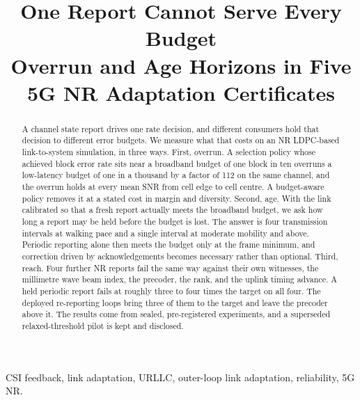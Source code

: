\documentclass[conference]{IEEEtran}
\begin{document}
\title{One Report Cannot Serve Every Budget\\
Overrun and Age Horizons in Five 5G NR Adaptation Certificates}

\author{
}

\maketitle
\thispagestyle{empty}
\pagestyle{empty}         %

\begin{abstract}
A channel state report drives one rate decision, and different consumers hold
that decision to different error budgets. We measure what that costs on an NR
LDPC-based link-to-system simulation, in three ways. First, overrun. A selection
policy whose achieved block error rate sits near a broadband budget of one block
in ten overruns a low-latency budget of one in a thousand by a factor of 112 on
the same channel, and the overrun holds at every mean SNR from cell edge to cell
centre. A budget-aware policy removes it at a stated cost in margin and
diversity. Second, age. With the link calibrated so that a fresh report actually
meets the broadband budget, we ask how long a report may be held before the
budget is lost. The answer is four transmission intervals at walking pace and a
single interval at moderate mobility and above. Periodic reporting alone then
meets the budget only at the frame minimum, and correction driven by
acknowledgements becomes necessary rather than optional. Third, reach. Four
further NR reports fail the same way against their own witnesses, the millimetre
wave beam index, the precoder, the rank, and the uplink timing advance. A held
periodic report fails at roughly three to four times the target on all four. The
deployed re-reporting loops bring three of them to the target and leave the
precoder above it. The results come from sealed, pre-registered experiments,
and a superseded relaxed-threshold pilot is kept and disclosed.
\end{abstract}

\begin{IEEEkeywords}
CSI feedback, link adaptation, URLLC, outer-loop link adaptation, reliability, 5G NR.
\end{IEEEkeywords}
\end{document}
